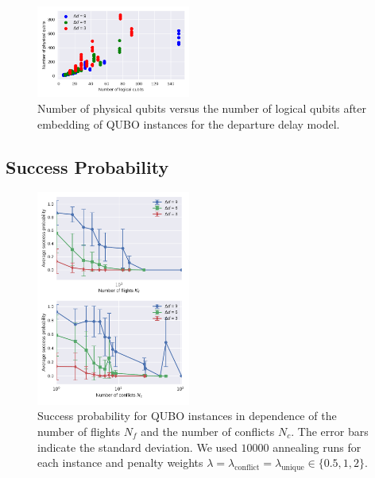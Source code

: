\begin{figure}[htpb]
    \centering
    \includegraphics[width=0.45\textwidth,natwidth=1,natheight=0]{./pics/physicalVsLogicalNumberOfQubits.pdf}
    \caption{Number of physical qubits versus the number of logical qubits after embedding of QUBO instances for the departure delay model.}
    \label{fig:number_of_physical_qubits}
\end{figure}

\subsection{Success Probability}

\begin{figure}[htpb]
    \centering
    \includegraphics[width=0.45\textwidth,natwidth=1,natheight=0]{./pics/annealing_results_success_vs_flights_and_conflicts.pdf}
    \caption{Success probability for QUBO instances in dependence of the number of flights $N_f$ and the number of conflicts $N_c$. 
             The error bars indicate the standard deviation.
             We used $10000$ annealing runs for each instance and penalty weights $\lambda = \lambda_\text{conflict} = \lambda_\text{unique} \in \{0.5, 1, 2\}$. 
    }
    \label{fig:success_probability}
\end{figure}

